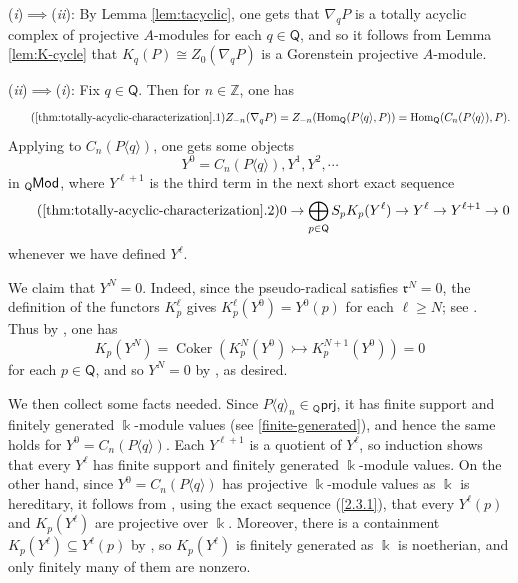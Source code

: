\documentclass{amsart}
\theoremstyle{bfupright head,slanted body}
\theoremstyle{bfupright head,upright body}
\theoremstyle{fixed bf head,slanted body}
\theoremstyle{fixed bf head,upright body}
\theoremstyle{numbered paragraph}
\newcounter{eqc}
\newenvironment{prf*}[1][Proof]{%
	\begin{proof}[\bf #1]
		\setcounter{equation}{0}
		\renewcommand{\theequation}{\arabic{equation}}}
	{\end{proof}
}
\newcommand{\eqclbl}[1]{{\upshape(\textit{#1})}}
\newcommand{\proofofimp}[3][:]{\mbox{\eqclbl{#2}$\!\implies\!$\eqclbl{#3}#1}}
\numberwithin{equation}{res}
\newcommand{\Hom}{\operatorname{Hom}}
\newcommand{\Q}{\mathsf{Q}}
\newcommand{\kk}{\Bbbk}
\newcommand{\lMod}[1]{{}_{#1}\mspace{-1mu}{\sf{Mod}}}
\newcommand{\nablaq}{\nabla_q}
\begin{document}
\begin{prf*}
\proofofimp{i}{ii} By Lemma \ref{lem:tacyclic}, one gets that $\nabla_qP$ is a totally acyclic complex of projective $A$-modules for each $q\in\Q$, and so it follows from Lemma \ref{lem:K-cycle} that $K_q(P)\cong Z_0(\nabla_qP)$ is a Gorenstein projective $A$-module.

\proofofimp{ii}{i} Fix $q\in\Q$. Then for $n\in\mathbb Z$, one has
\begin{equation}\tag{\ref{thm:totally-acyclic-characterization}.1}\label{2.3.0}
Z_{-n}(\nablaq P)=Z_{-n}(\Hom_{\Q}(P\langle q\rangle,P))=\Hom_{\Q}(C_n(P\langle q\rangle),P).
\end{equation}
Applying \cite[Construction 7.21(a)]{HJ22} to $C_n(P\langle q\rangle)$, one gets some objects
$$Y^0=C_n(P\langle q\rangle), Y^1, Y^2, \cdots$$
in $\lMod{\Q}$, where $Y^{\ell+1}$ is the third term in the next short exact sequence
\begin{equation}\tag{\ref{thm:totally-acyclic-characterization}.2}\label{2.3.1}
0\to\bigoplus_{p\in \Q}S_pK_p(Y^\ell)\to Y^\ell\to Y^{\ell+1}\to 0
\end{equation}
whenever we have defined $Y^\ell$.

We claim that $Y^N=0$. Indeed, since the pseudo-radical satisfies \(\mathfrak r^N=0\), the definition of the functors $K_p^\ell$ gives $K_p^\ell(Y^0)=Y^0(p)$ for each $\ell\ge N$; see \cite[Definition 7.22]{HJ22}. Thus by \cite[Lemma 7.24(a)]{HJ22}, one has
$$K_p(Y^N)=\operatorname{Coker}(K_p^N(Y^0)\rightarrowtail K_p^{N+1}(Y^0))=0$$
for each $p\in\Q$, and so $Y^N=0$ by \cite[Proposition 7.19]{HJ22}, as desired.

We then collect some facts needed. Since $P\langle q\rangle_n\in{}_\Q\mathsf{prj}$, it has finite support and finitely generated $\kk$-module values (see \ref{finite-generated}), and hence the same holds for $Y^0=C_n(P\langle q\rangle)$. Each $Y^{\ell+1}$ is a quotient of $Y^\ell$, so induction shows that every $Y^\ell$ has finite support and finitely generated $\kk$-module values. On the other hand, since $Y^0=C_n(P\langle q\rangle)$ has projective
$\kk$-module values as $\kk$ is hereditary, it follows from \cite[Proposition 7.20(a)]{HJ22}, using the exact sequence (\ref{2.3.1}), that every $Y^\ell(p)$ and $K_p(Y^\ell)$ are projective over $\kk$. Moreover, there is a containment $K_p(Y^\ell)\subseteq Y^\ell(p)$ by \cite[Proposition 7.18]{HJ22}, so $K_p(Y^\ell)$ is finitely generated as $\kk$ is noetherian, and only finitely many of them are nonzero.


\end{prf*}
\end{document}
